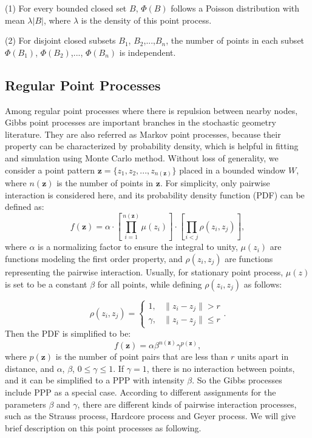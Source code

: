 (1) For every bounded closed set $B$, $\Phi(B)$ follows a Poisson distribution with mean $\lambda|B|$, where $\lambda$ is the density of this point process.

(2) For disjoint closed subsets $B_1$, $B_2$,...,$B_n$, the number of points in each subset $\Phi(B_1)$, $\Phi(B_2)$,..., $\Phi(B_n)$ is independent.
\subsection{Regular Point Processes}
Among regular point processes where there is repulsion between nearby nodes, Gibbs point processes are important branches in the stochastic geometry literature. They are also referred as Markov point processes, because their property can be characterized by probability density, which is helpful in fitting and simulation using Monte Carlo method. Without loss of generality, we consider a point pattern $\mathbf{z} =\lbrace z_1,z_2,...,z_{n(\mathbf{z})}\rbrace $ placed in a bounded window $W$, where $n(\mathbf{z})$ is the number of points in $\mathbf{z}$. For simplicity, only pairwise interaction is considered here, and its probability density function (PDF) can be defined as:
\begin{equation} \label{gpdf}
       f(\mathbf{z})= \alpha\cdot[\prod_{i=1}^{n(\mathbf{z})}\mu(z_i)]\cdot[\prod_{i<j}\rho(z_i,z_j)],
\end{equation}
where $\alpha$ is a normalizing factor to ensure the integral to unity, $\mu(z_i)$ are functions modeling the first order property, and $\rho(z_i,z_j)$ are functions representing the pairwise interaction. Usually, for stationary point process, $\mu(z)$ is set to be a constant $\beta$ for all points, while defining $\rho(z_i,z_j)$ as follows:

\begin{equation} \label{gamma}
\rho(z_i,z_j)=\left\{
\begin{array}{ll}
1, & \parallel z_i-z_j \parallel > r\\
\gamma, & \parallel z_i-z_j\parallel \leq r
\end{array} \right..
\end{equation}
Then the PDF is simplified to be:
\begin{equation} \label{gpdfs}
f(\mathbf{z})=\alpha\beta^{n(\mathbf{z})}\gamma^{p(\mathbf{z})},
\end{equation}
where $p(\mathbf{z})$ is the number of point pairs that are less than $r$ units apart in distance, and $\alpha$, $\beta$, $0\leq\gamma\leq1$. If $\gamma=1$, there is no interaction between points, and it can be simplified to a PPP with intensity $\beta$. So the Gibbs processes include PPP as a special case. According to different assignments for the parameters $\beta$ and $\gamma$, there are different kinds of pairwise interaction processes, such as the Strauss process, Hardcore process and Geyer process. We will give brief description on this point processes as following.

